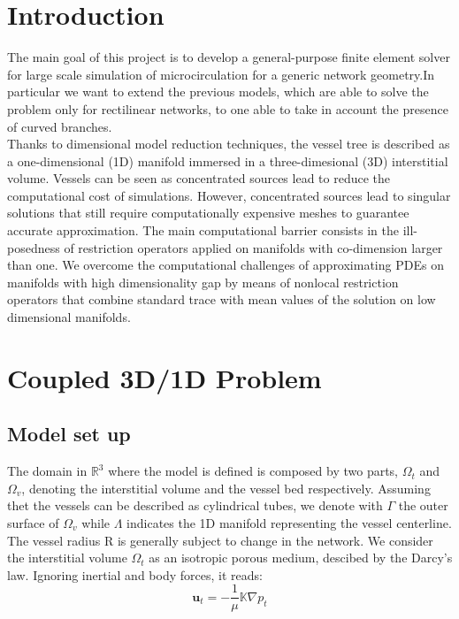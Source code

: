 \documentclass[a4paper]{report}
\begin{document}
\tableofcontents
 
 
\chapter*{Introduction}
\setcounter{page}{1} 
The main goal of this project is to develop a general-purpose finite element solver for large scale simulation of microcirculation for a generic network geometry.In particular we want to extend the previous models, which are able to solve the problem only for rectilinear networks, to one able to take in account the presence of curved branches.\\
Thanks to dimensional model reduction techniques, the vessel tree is described as a one-dimensional (1D) manifold immersed in a three-dimesional (3D) interstitial volume. Vessels can be seen as concentrated sources lead to reduce the computational cost of simulations. However, concentrated sources lead to singular solutions that still require computationally expensive meshes to guarantee accurate approximation. The main computational barrier consists in the ill-posedness of restriction operators applied on manifolds with co-dimension larger than one. We overcome the computational challenges of approximating PDEs on manifolds with high dimensionality gap by means of nonlocal restriction operators that combine standard trace with mean values of the solution on low dimensional manifolds.\\



\newpage
\chapter{Coupled 3D/1D Problem}
	\section{Model set up}
	The domain in $\mathbb{R}^{3} $ where the model is defined is composed by two parts, $\Omega_{t}$ and $\Omega_{v}$, denoting the interstitial volume and the vessel bed respectively. Assuming thet the vessels can be described as cylindrical tubes, we denote with $    	\Gamma$ the outer surface of $\Omega_{v}$ while $\Lambda$ indicates the 1D manifold representing the vessel centerline. The vessel radius R is generally subject to change in the network.\newline
	We consider the interstitial volume $\Omega_{t}$ as an isotropic porous medium, descibed by the Darcy's law. Ignoring inertial and body forces, it reads:
\begin{equation}
\mathbf{u}_{t} =  -\frac{1}{\mu}\boldsymbol{\mathbb{K}}\nabla p_{t} 
\end{equation}
\end{document}
